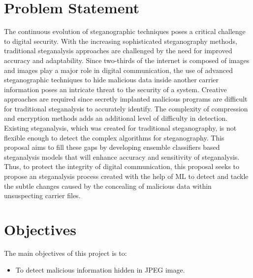 \clearpage
\section{Problem Statement}
The continuous evolution of steganographic techniques poses a critical challenge to digital security. With the increasing sophisticated steganography methods, traditional steganalysis approaches are challenged by the need for improved accuracy and adaptability. Since two-thirds of the internet is composed of images and images play a major role in digital communication, the use of advanced steganographic techniques to hide malicious data inside another carrier information poses an intricate threat to the security of a system. Creative approaches are required since secretly implanted malicious programs are difficult for traditional steganalysis to accurately identify. The complexity of compression and encryption methods adds an additional level of difficulty in detection. Existing steganalysis, which was created for traditional steganography, is not flexible enough to detect the complex algorithms for steganography. This proposal aims to fill these gaps by developing ensemble classifiers based steganalysis models that will enhance accuracy and sensitivity of steganalysis. Thus, to protect the integrity of digital communication, this proposal seeks to propose an steganalysis process created with the help of ML to detect and tackle the subtle changes caused by the concealing of malicious data within unsuspecting carrier files.\\
\section{Objectives}
The main objectives of this project is to:
\begin{itemize}
\item  To detect malicious information hidden in JPEG image.

\end{itemize}

